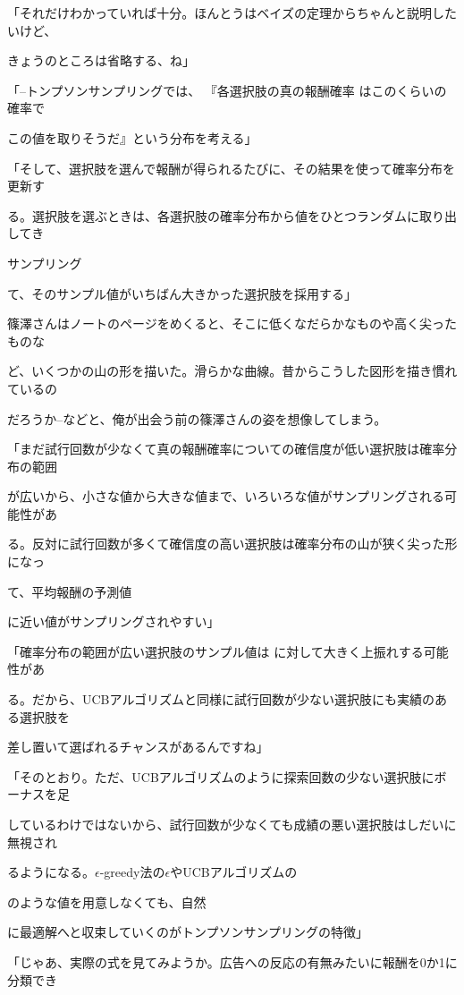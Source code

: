 「それだけわかっていれば⼗分。ほんとうはベイズの定理からちゃんと説明したいけど、\par
きょうのところは省略する、ね」\par
「--トンプソンサンプリングでは、 『各選択肢の真の報酬確率 はこのくらいの確率で\par
この値を取りそうだ』という分布を考える」\par
「そして、選択肢を選んで報酬が得られるたびに、その結果を使って確率分布を更新す\par
る。選択肢を選ぶときは、各選択肢の確率分布から値をひとつランダムに取り出してき\par
サンプリング\par
て、そのサンプル値がいちばん⼤きかった選択肢を採⽤する」\par
篠澤さんはノートのページをめくると、そこに低くなだらかなものや⾼く尖ったものな\par
ど、いくつかの⼭の形を描いた。滑らかな曲線。昔からこうした図形を描き慣れているの\par
だろうか--などと、俺が出会う前の篠澤さんの姿を想像してしまう。\par
「まだ試⾏回数が少なくて真の報酬確率についての確信度が低い選択肢は確率分布の範囲\par
が広いから、⼩さな値から⼤きな値まで、いろいろな値がサンプリングされる可能性があ\par
る。反対に試⾏回数が多くて確信度の⾼い選択肢は確率分布の⼭が狭く尖った形になっ\par
て、平均報酬の予測値\par
に近い値がサンプリングされやすい」\par
「確率分布の範囲が広い選択肢のサンプル値は に対して⼤きく上振れする可能性があ\par
る。だから、UCBアルゴリズムと同様に試⾏回数が少ない選択肢にも実績のある選択肢を\par
差し置いて選ばれるチャンスがあるんですね」\par
「そのとおり。ただ、UCBアルゴリズムのように探索回数の少ない選択肢にボーナスを⾜\par
しているわけではないから、試⾏回数が少なくても成績の悪い選択肢はしだいに無視され\par
るようになる。$\epsilon$-greedy法の$\epsilon$やUCBアルゴリズムの\par
のような値を⽤意しなくても、⾃然\par
に最適解へと収束していくのがトンプソンサンプリングの特徴」\par
「じゃあ、実際の式を⾒てみようか。広告への反応の有無みたいに報酬を0か1に分類でき\par

